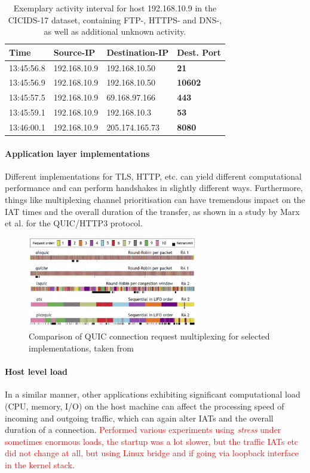 \documentclass{article}
\begin{document}
\begin{table}[h!]
\centering
\begin{tabular}{l|l|l|>{\bfseries}l}
Time&  Source-IP &Destination-IP& Dest. Port\\ \hline
13:45:56.8 & 192.168.10.9 &  192.168.10.50 &       21 \\ \hline
13:45:56.9 & 192.168.10.9 &  192.168.10.50 &    10602\\ \hline
13:45:57.5 & 192.168.10.9 &  69.168.97.166 &      443\\ \hline
13:45:59.1 & 192.168.10.9 &   192.168.10.3 &       53\\ \hline
13:46:00.1 & 192.168.10.9 & 205.174.165.73 &     8080\\ \hline
\end{tabular}
\caption{Exemplary activity interval for host 192.168.10.9 in the CICIDS-17 dataset, containing FTP-, HTTPS- and DNS-, as well as additional unknown activity.}\label{Tab:Sess}
\end{table}

\paragraph{Application layer implementations}
Different implementations for TLS, HTTP, etc. can yield different computational performance and can perform handshakes in slightly different ways. Furthermore, things like multiplexing channel prioritisation can have tremendous impact on the IAT times and the overall duration of the transfer, as shown in a study by Marx et al.  \cite{marx2020same} for the QUIC/HTTP3 protocol.

\begin{figure}
\centering
\includegraphics[width=0.658\textwidth]{images/Proto_differences_small.png}
\caption{Comparison of QUIC connection request multiplexing for selected implementations, taken from \cite{marx2020same}}
\end{figure}


\paragraph{Host level load}
In a similar manner, other applications exhibiting significant computational load (CPU, memory, I/O) on the host machine can affect the processing speed of incoming and outgoing traffic, which can again alter IATs and the  overall duration of a connection. \textcolor{red}{Performed various experiments using \textit{stress} under sometimes enormous loads, the startup was a lot slower, but the traffic IATs etc did not change at all, but using Linux bridge and if going via loopback interface in the kernel stack}.
\end{document}
